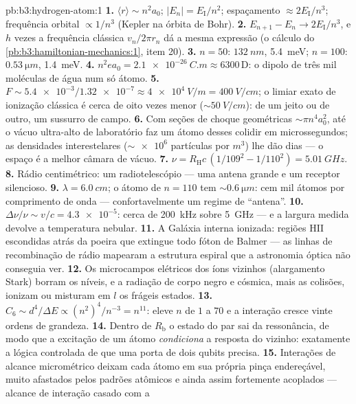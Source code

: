 \begin{solution}{pb:b3:hydrogen-atom:1}
\textbf{1.} $\langle r\rangle \sim n^2a_0$; $|E_n| =
E_{\text{I}}/n^2$; espaçamento $\approx 2E_{\text{I}}/n^3$;
frequência orbital $\propto 1/n^3$ (Kepler na órbita de Bohr).
\textbf{2.} $E_{n+1} - E_n \to 2E_{\text{I}}/n^3$, e $h$ vezes a
frequência clássica $v_n/2\pi r_n$ dá a mesma expressão (o cálculo do
\cref{pb:b3:hamiltonian-mechanics:1}, item 20).
\textbf{3.} $n = 50$: $\qty{132}{nm}$, \qty{5.4}{meV}; $n = 100$:
$\qty{0.53}{\micro m}$, \qty{1.4}{meV}.
\textbf{4.} $n^2ea_0 = \qty{2.1e-26}{C.m} \approx 6300\,\text{D}$:
o dipolo de três mil moléculas de água num só átomo.
\textbf{5.} $F \sim \num{5.4e-3}/\num{1.32e-7} \approx
\qty{4e4}{V/m} = \qty{400}{V/cm}$; o limiar exato de ionização
clássica é cerca de oito vezes menor ($\sim\qty{50}{V/cm}$): de um
jeito ou de outro, um sussurro de campo.
\textbf{6.} Com seções de choque geométricas $\sim\pi n^4a_0^2$, até o
vácuo ultra-alto de laboratório faz um átomo desses colidir em
microssegundos; as densidades interestelares ($\sim\num{e6}$ partículas
por $\unit{m^3}$) lhe dão dias --- o espaço é a melhor câmara de vácuo.
\textbf{7.} $\nu = R_{\text{H}}c\,(1/109^2 - 1/110^2) =
\qty{5.01}{GHz}$.
\textbf{8.} Rádio centimétrico: um radiotelescópio --- uma antena
grande e um receptor silencioso.
\textbf{9.} $\lambda = \qty{6.0}{cm}$; o átomo de $n = 110$ tem
$\sim\qty{0.6}{\micro m}$: cem mil átomos por comprimento de onda ---
confortavelmente um regime de ``antena''.
\textbf{10.} $\Delta\nu/\nu \sim v/c = \num{4.3e-5}$: cerca de
\qty{200}{kHz} sobre \qty{5}{GHz} --- e a largura medida devolve a
temperatura nebular.
\textbf{11.} A Galáxia interna ionizada: regiões HII escondidas atrás
da poeira que extingue todo fóton de Balmer --- as linhas de
recombinação de rádio mapearam a estrutura espiral que a astronomia
óptica não conseguia ver.
\textbf{12.} Os microcampos elétricos dos íons vizinhos (alargamento
Stark) borram os níveis, e a radiação de corpo negro e cósmica, mais as
colisões, ionizam ou misturam em $l$ os frágeis estados.
\textbf{13.} $C_6 \sim d^4/\Delta E \propto (n^2)^4/n^{-3} =
n^{11}$: eleve $n$ de $1$ a $70$ e a interação cresce vinte ordens de
grandeza.
\textbf{14.} Dentro de $R_{\text{b}}$ o estado do par sai da
ressonância, de modo que a excitação de um átomo \emph{condiciona} a
resposta do vizinho: exatamente a lógica controlada de que uma porta de
dois qubits precisa.
\textbf{15.} Interações de alcance micrométrico deixam cada átomo em
sua própria pinça endereçável, muito afastados pelos padrões atômicos e
ainda assim fortemente acoplados --- alcance de interação casado com a

\end{solution}
